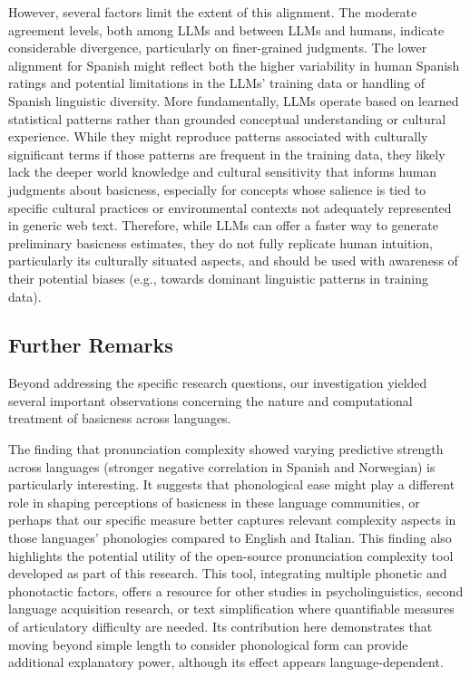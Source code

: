 \documentclass[preprint,12pt,authoryear]{elsarticle}
\begin{document}
However, several factors limit the extent of this alignment. The moderate agreement levels, both among LLMs and between LLMs and humans, indicate considerable divergence, particularly on finer-grained judgments. The lower alignment for Spanish might reflect both the higher variability in human Spanish ratings and potential limitations in the LLMs' training data or handling of Spanish linguistic diversity. More fundamentally, LLMs operate based on learned statistical patterns rather than grounded conceptual understanding or cultural experience. While they might reproduce patterns associated with culturally significant terms if those patterns are frequent in the training data, they likely lack the deeper world knowledge and cultural sensitivity that informs human judgments about basicness, especially for concepts whose salience is tied to specific cultural practices or environmental contexts not adequately represented in generic web text. Therefore, while LLMs can offer a faster way to generate preliminary basicness estimates, they do not fully replicate human intuition, particularly its culturally situated aspects, and should be used with awareness of their potential biases (e.g., towards dominant linguistic patterns in training data).

\subsection{Further Remarks}

Beyond addressing the specific research questions, our investigation yielded several important observations concerning the nature and computational treatment of basicness across languages.

The finding that pronunciation complexity showed varying predictive strength across languages (stronger negative correlation in Spanish and Norwegian) is particularly interesting. It suggests that phonological ease might play a different role in shaping perceptions of basicness in these language communities, or perhaps that our specific measure better captures relevant complexity aspects in those languages' phonologies compared to English and Italian. This finding also highlights the potential utility of the open-source pronunciation complexity tool developed as part of this research. This tool, integrating multiple phonetic and phonotactic factors, offers a resource for other studies in psycholinguistics, second language acquisition research, or text simplification where quantifiable measures of articulatory difficulty are needed. Its contribution here demonstrates that moving beyond simple length to consider phonological form can provide additional explanatory power, although its effect appears language-dependent.
\end{document}
